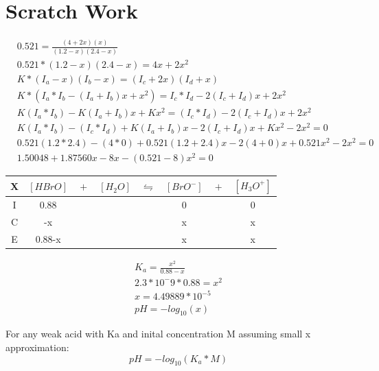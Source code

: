 \documentclass{article}  %
\begin{document}


\newpage
\section*{Scratch Work}

\begin{equation*}
    \begin{aligned}
        &0.521 = \frac{(4+2x)(x)}{(1.2-x)(2.4-x)} \\
        &0.521 * (1.2-x)(2.4-x) = 4x+ 2x^2 \\ 
        &K * (I_a - x)(I_b - x) = (I_c + 2x)(I_d + x)\\
        &K * (I_a* I_b - (I_a + I_b)x + x^2) = I_c* I_d - 2(I_c + I_d)x + 2x^2 \\
        &K(I_a* I_b) - K(I_a + I_b)x + Kx^2 = (I_c* I_d) - 2(I_c + I_d)x + 2x^2 \\
        &K(I_a* I_b) - (I_c* I_d) + K(I_a + I_b)x - 2(I_c + I_d)x + Kx^2 - 2x^2 = 0 \\
        &0.521(1.2*2.4) - (4*0) + 0.521(1.2 + 2.4)x - 2(4+0)x + 0.521x^2 - 2x^2 = 0 \\
        &1.50048 + 1.87560x - 8x - (0.521-8)x^2 = 0
    \end{aligned}
\end{equation*}

\begin{tabular}{c|c@{}c@{}c@{}c@{}c@{}c@{}c}
    \hline
    X   & $[HBrO]$ & ${}+{}$ & $[H_2O]$ & ${}\leftrightharpoons{}$ & $[BrO^-]$ & ${}+{}$ & $[H_3O^+]$ \\
    \hline
    I   &  0.88    &&     &&  0   && 0  \\
    C   &   -x   &&     &&  x   &&  x \\
    E   &   0.88-x   &&     &&   x  && x  \\      
\end{tabular}

\begin{equation*}
    \begin{aligned}
        K_a = \frac{x^2}{0.88-x} \\
        2.3*10^-9 * 0.88 = x^2 \\
        x = 4.49889*10^{-5} \\
        pH = -log_{10}(x)     
    \end{aligned}
\end{equation*}

For any weak acid with Ka and inital concentration M assuming small x approximation:
\begin{equation}
    pH = - log_{10}(K_a*M)
\end{equation}
\end{document}
